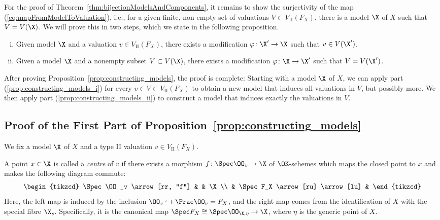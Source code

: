For the proof of Theorem~\ref{thm:bijectionModelsAndComponents}, it remains to show the surjectivity of the map (\eqref{eq:mapFromModelToValuation}),
i.e., for a given finite, non-empty set of valuations
$V \subset V_\textrm{II}(F_X)$, there is a model $\X$ of $X$ such that $V = V(\X)$.
We will prove this in two steps, which we state in the following proposition.

\begin{proposition} \label{prop:constructing_models}
    \begin{enumerate}[(i)]
        \item Given model $\X$ and a valuation $v \in V_\textrm{II}(F_X)$, there exists a modification
        $\varphi \colon \X' \to \X$ such that $v \in V(\X')$. \label{prop:constructing_models_i}
        \item Given a model $\X$ and a nonempty subset $V \subset V(\X)$,
        there exists a modification $\varphi \colon \X \to \X'$ such that $V = V(\X')$. \label{prop:constructing_models_ii}
    \end{enumerate}
\end{proposition}

After proving Proposition~\ref{prop:constructing_models}, the proof is complete:
Starting with a model $\X$ of $X$, we can apply part (\ref{prop:constructing_models_i}) for every $v \in V \subset V_\textrm{II}(F_X)$
to obtain a new model that induces all valuations in $V$, but possibly more.
We then apply part (\ref{prop:constructing_models_ii}) to construct a model that induces exactly the valuations in $V$.


\subsection{Proof of the First Part of Proposition~\ref{prop:constructing_models}}\label{subsec:proof-of-the-first-part}

We fix a model $\X$ of $X$ and a type II valuation $v \in V_\textrm{II}(F_X)$.

\begin{definition}
    A point $x \in \X$ is called a \textit{centre} of $v$ if there exists a morphism $f \colon \Spec \OO_v  \to \X$ of $\OK $-schemes
    which maps the closed point to $x$ and makes the following diagram commute:
    \[
        \begin{tikzcd}
            \Spec \OO_v \arrow[rr, "f"] &                                 & \X \\
            & \Spec F_X \arrow[ru] \arrow[lu] &
        \end{tikzcd}
    \]
    Here, the left map is induced by the inclusion $\OO_v \hookrightarrow \Frac \OO_v = F_X$,
    and the right map comes from the identification of $X$ with the special fibre $\X_s$.
    Specifically, it is the canonical map $\Spec F_X \cong \Spec \OO_{\X, \eta} \to \X$, where $\eta$ is the generic point of $X$.
\end{definition}

